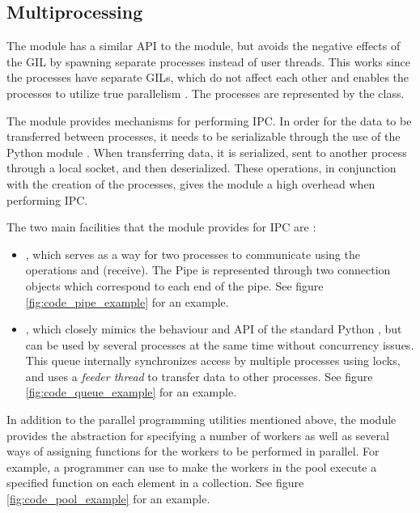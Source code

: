 \subsection{Multiprocessing}
The  module has a similar API to the  module, but avoids the negative effects of the GIL by spawning
separate processes instead of user threads. This works since the processes have separate GILs, which do not affect each other and
enables the processes to utilize true parallelism \cite{slatkin_2015_effective_ep5swtwbp}. The processes are represented by the  class.

The  module provides mechanisms for performing IPC.
In order for the data to be transferred between processes, it needs to be serializable through the use of the Python 
module \cite[p. 143]{slatkin_2015_effective_ep5swtwbp}. When transferring data, it is serialized, sent to another process through
a local socket, and then deserialized. These operations, in conjunction with the creation of the processes, gives the
 module a high overhead when performing IPC.

The two main facilities that the  module provides for IPC are \cite{palach_2014_parallel_ppwp}:
\begin{itemize}
  \item {}, which serves as a way for two processes to communicate using the operations 
    and  (receive). The Pipe is represented through two connection objects which correspond to each end of the pipe.
    See figure \ref{fig:code_pipe_example} for an example.
  \item {}, which closely mimics the behaviour and API of the standard Python , but
    can be used by several processes at the same time without concurrency issues. This  queue internally
    synchronizes access by multiple processes using locks, and uses a \emph{feeder thread} to transfer data to other processes.
    See figure \ref{fig:code_queue_example} for an example.
\end{itemize}

In addition to the parallel programming utilities mentioned above, the  module provides the  abstraction
for specifying a number of workers as well as several ways of assigning functions for the workers to be performed in parallel. For
example, a programmer can use  to make the workers in the pool execute a specified function on each element in a
collection.
See figure \ref{fig:code_pool_example} for an example.

